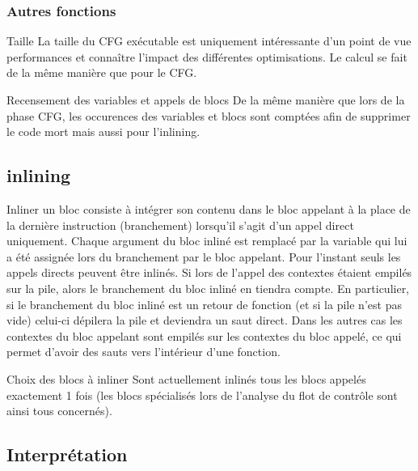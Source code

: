 \documentclass{beamer}
\begin{document}
\subsubsection{Autres fonctions}

\begin{frame}{Taille}
    La taille du CFG exécutable est uniquement intéressante d'un point de vue performances et connaître l'impact des différentes optimisations. Le calcul se fait de la même manière que pour le CFG.
\end{frame}

\begin{frame}{Recensement des variables et appels de blocs}
    De la même manière que lors de la phase CFG, les occurences des variables et blocs sont comptées afin de supprimer le code mort mais aussi pour l'inlining.
\end{frame}

\subsection{inlining}

Inliner un bloc consiste à intégrer son contenu dans le bloc appelant à la place de la dernière instruction (branchement) lorsqu'il s'agit d'un appel direct uniquement. Chaque argument du bloc inliné est remplacé par la variable qui lui a été assignée lors du branchement par le bloc appelant. Pour l'instant seuls les appels directs peuvent être inlinés. Si lors de l'appel des contextes étaient empilés sur la pile, alors le branchement du bloc inliné en tiendra compte. En particulier, si le branchement du bloc inliné est un retour de fonction (et si la pile n'est pas vide) celui-ci dépilera la pile et deviendra un saut direct. Dans les autres cas les contextes du bloc appelant sont empilés sur les contextes du bloc appelé, ce qui permet d'avoir des sauts vers l'intérieur d'une fonction.

\begin{frame}{Choix des blocs à inliner}
    Sont actuellement inlinés tous les blocs appelés exactement 1 fois (les blocs spécialisés lors de l'analyse du flot de contrôle sont ainsi tous concernés).
\end{frame}



\subsection{Interprétation}
\end{document}
